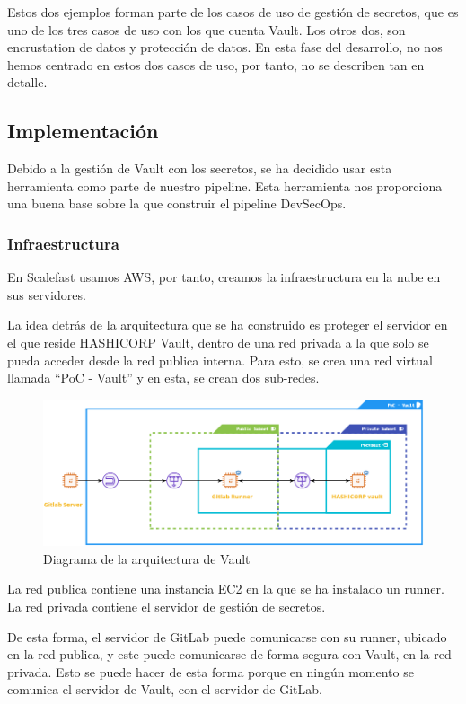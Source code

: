 \documentclass[12pt]{report} %
\begin{document}
Estos dos ejemplos forman parte de los casos de uso de gestión de secretos, que
es uno de los tres casos de uso con los que cuenta Vault.
Los otros dos, son encrustation de datos y protección de datos.
En esta fase del desarrollo, no nos hemos centrado en estos dos casos de uso,
por tanto, no se describen tan en detalle.

\subsection{Implementación}

Debido a la gestión de Vault con los secretos, se ha decidido usar esta
herramienta como parte de nuestro \gls{pipeline}.
Esta herramienta nos proporciona una buena base sobre la que construir el
\gls{pipeline} \gls{DevSecOps}.

\subsubsection{Infraestructura}

En Scalefast usamos \gls{AWS}, por tanto, creamos la infraestructura en la nube
en sus servidores.

La idea detrás de la arquitectura que se ha construido es proteger el servidor
en el que reside HASHICORP Vault, dentro de una red privada a la que solo se
pueda acceder desde la red publica interna.
Para esto, se crea una red virtual llamada ``PoC - Vault'' y en esta, se crean
dos sub-redes.

\begin{figure}[H]
  \includegraphics[width=\textwidth]{Vault-Architecture} 
  \caption{Diagrama de la arquitectura de Vault}
  \label{fig:VaultArchitecture}
\end{figure}

La red publica contiene una instancia \gls{EC2} en la que se ha instalado un
\gls{runner}.
La red privada contiene el servidor de gestión de secretos.

De esta forma, el servidor de GitLab puede comunicarse con su \gls{runner},
ubicado en la red publica, y este puede comunicarse de forma segura con Vault,
en la red privada.
Esto se puede hacer de esta forma porque en ningún momento se comunica el
servidor de Vault, con el servidor de GitLab.
\end{document}
